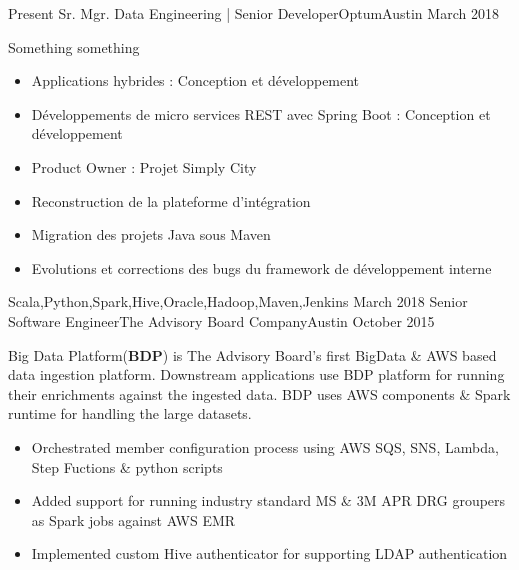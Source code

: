 %
%
%

\begin{experiences}
  \experience
    {Present}   {Sr. Mgr. Data Engineering | Senior Developer}{Optum}{Austin}
    {March 2018} {
    				  {Something something}
                      \begin{itemize}
                        \item Applications hybrides : Conception et développement
                        \item Développements de micro services REST avec Spring Boot : Conception et développement
                        \item Product Owner : Projet Simply City
                        \item Reconstruction de la plateforme d'intégration
                        \item Migration des projets Java sous Maven
                        \item Evolutions et corrections des bugs du framework de développement interne  
                      \end{itemize}
                    }
                    {Scala,Python,Spark,Hive,Oracle,Hadoop,Maven,Jenkins}
  \emptySeparator
  \experience
    {March 2018} {Senior Software Engineer}{The Advisory Board Company}{Austin}
    {October 2015}    
    			 {
    	              Big Data Platform(\textbf{BDP}) is The Advisory Board's first BigData \& AWS based data ingestion platform. Downstream applications use BDP platform for running their enrichments against the ingested data. BDP uses AWS components \& Spark runtime for handling the large datasets.
    	              \begin{itemize}
    	              	\item Orchestrated member configuration process using AWS SQS, SNS, Lambda, Step Fuctions \& python scripts                           
    	              	\item Added support for running industry standard MS \& 3M APR DRG groupers as Spark jobs against AWS EMR                        
    	              	\item Implemented custom Hive authenticator for supporting LDAP authentication  

\end{itemize}}
\end{experiences}
